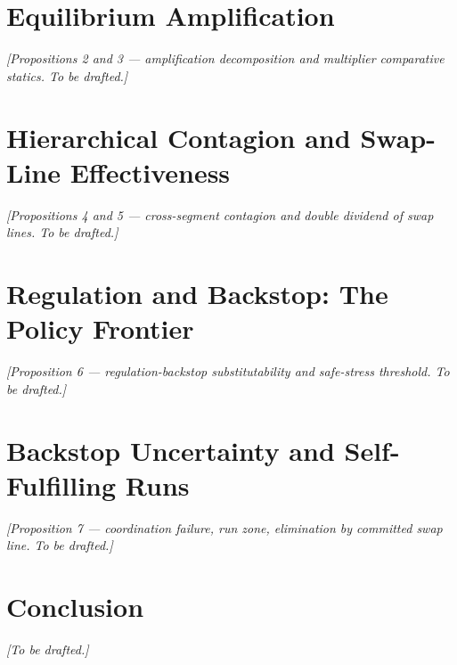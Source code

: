 \documentclass[12pt]{article}
\newcommand{\1}[1]{\mathds{1}\left[#1\right]}
\begin{document}
\section{Equilibrium Amplification}
\label{sec:results}

\emph{[Propositions 2 and 3 — amplification decomposition and multiplier comparative statics.
To be drafted.]}

\section{Hierarchical Contagion and Swap-Line Effectiveness}
\label{sec:contagion}

\emph{[Propositions 4 and 5 — cross-segment contagion and double dividend of swap lines.
To be drafted.]}

\section{Regulation and Backstop: The Policy Frontier}
\label{sec:policy}

\emph{[Proposition 6 — regulation-backstop substitutability and safe-stress threshold.
To be drafted.]}

\section{Backstop Uncertainty and Self-Fulfilling Runs}
\label{sec:runs}

\emph{[Proposition 7 — coordination failure, run zone, elimination by committed swap line.
To be drafted.]}

\section{Conclusion}
\label{sec:conclusion}

\emph{[To be drafted.]}


\clearpage
{\small \printbibliography}
\end{document}
